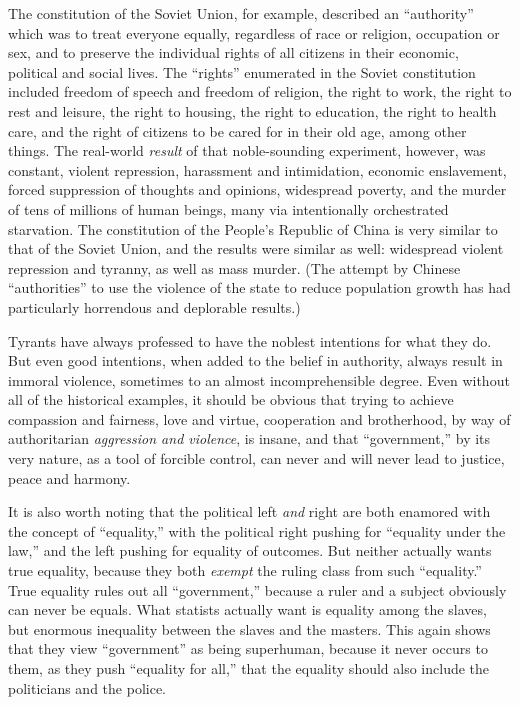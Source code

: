 \documentclass{book}
\begin{document}
The constitution of the Soviet Union, for example, described an \enquote{authority} which was to treat everyone equally, regardless of race or religion, occupation or sex, and to preserve the individual rights of all citizens in their economic, political and social lives. The \enquote{rights} enumerated in the Soviet constitution included freedom of speech and freedom of religion, the right to work, the right to rest and leisure, the right to housing, the right to education, the right to health care, and the right of citizens to be cared for in their old age, among other things. The real-world \emph{result} of that noble-sounding experiment, however, was constant, violent repression, harassment and intimidation, economic enslavement, forced suppression of thoughts and opinions, widespread poverty, and the murder of tens of millions of human beings, many via intentionally orchestrated starvation. The constitution of the People's Republic of China is very similar to that of the Soviet Union, and the results were similar as well: widespread violent repression and tyranny, as well as mass murder. (The attempt by Chinese \enquote{authorities} to use the violence of the state to reduce population growth has had particularly horrendous and deplorable results.)

Tyrants have always professed to have the noblest intentions for what they do. But even good intentions, when added to the belief in authority, always result in immoral violence, sometimes to an almost incomprehensible degree. Even without all of the historical examples, it should be obvious that trying to achieve compassion and fairness, love and virtue, cooperation and brotherhood, by way of authoritarian \emph{aggression and violence}, is insane, and that \enquote{government,} by its very nature, as a tool of forcible control, can never and will never lead to justice, peace and harmony.

It is also worth noting that the political left \emph{and} right are both enamored with the concept of \enquote{equality,} with the political right pushing for \enquote{equality under the law,} and the left pushing for equality of outcomes. But neither actually wants true equality, because they both \emph{exempt} the ruling class from such \enquote{equality.} True equality rules out all \enquote{government,} because a ruler and a subject obviously can never be equals. What statists actually want is equality among the slaves, but enormous inequality between the slaves and the masters. This again shows that they view \enquote{government} as being superhuman, because it never occurs to them, as they push \enquote{equality for all,} that the equality should also include the politicians and the police.
\end{document}
